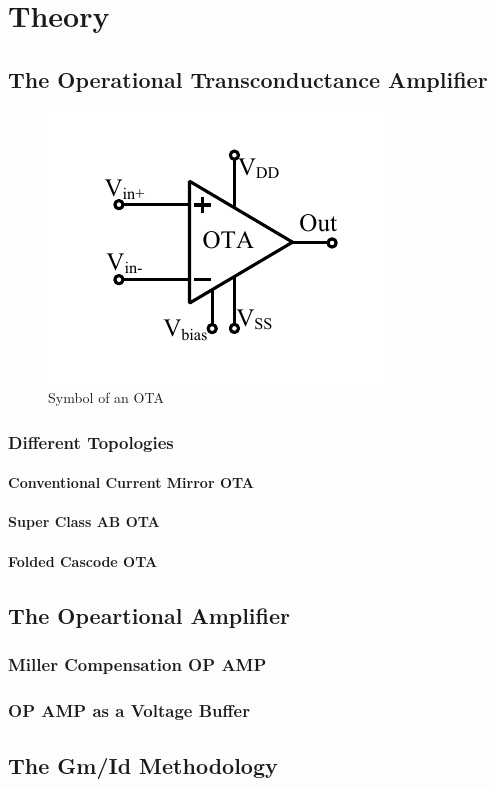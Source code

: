 \chapter{Theory}
\section{The Operational Transconductance Amplifier}

\begin{figure} [H]
\centering
\includegraphics[scale=1]{Figures/System_Level/OTA_Symbol.pdf}
\caption{Symbol of an OTA}
\end{figure}


\subsection{Different Topologies}
\subsubsection{Conventional Current Mirror OTA}
\subsubsection{Super Class AB OTA}
\subsubsection{Folded Cascode OTA}
\section{The Opeartional Amplifier}
\subsection{Miller Compensation OP AMP}
\subsection{OP AMP as a Voltage Buffer}
\section{The Gm/Id Methodology}
